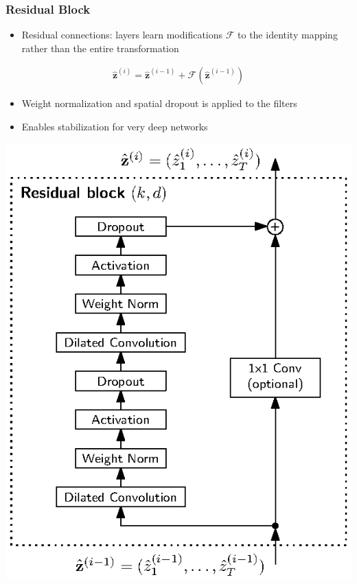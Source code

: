 \documentclass{beamer}
\begin{document}
\begin{frame}
\frametitle{Residual Block}
\begin{minipage}{0.55\textwidth} 
\begin{itemize}
\item Residual connections: layers learn modifications $\mathcal F$ to the identity mapping rather than the entire transformation \cite{He2016}
\end{itemize}
\vspace{-0.5em}
\begin{align}
\hat{\mathbf z}^{(i)} = \hat{\mathbf z}^{(i-1)} + \mathcal F( \hat{\mathbf z}^{(i-1)})
\end{align}
\vspace{-1em}
\begin{itemize}
\item Weight normalization \cite{Salimans2016} and spatial dropout \cite{Srivastava2014} is applied to the filters
\item Enables stabilization for very deep networks
\end{itemize}
\end{minipage}
\hspace{-0.5em}
\begin{minipage}{0.4\textwidth} 
\centering
\vspace{-0.6em}
\includegraphics[scale=0.7]{figures/residual_block.eps}
\end{minipage}
\end{frame}
\end{document}
